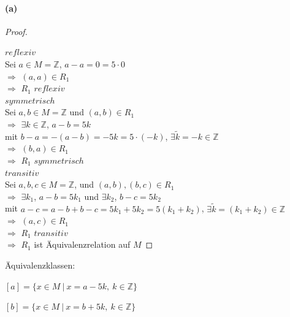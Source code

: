\paragraph{(a)}
\begin{proof}
$ $\newline

$reflexiv$\\
Sei $a\in M=\mathbb{Z}$, $a-a=0=5\cdot 0$\\
$\Rightarrow$ $(a,a)\in R_1$\\
$\Rightarrow$ $R_1$ $reflexiv$\\

$symmetrisch$\\
Sei $a,b\in M=\mathbb{Z}$ und $(a,b)\in R_1$\\
$\Rightarrow$ $\exists k\in\mathbb{Z}$, $a-b=5k$\\
mit $b-a=-(a-b)=-5k=5\cdot(-k)$, $\exists\tilde{k}=-k\in\mathbb{Z}$\\
$\Rightarrow$ $(b,a)\in R_1$\\
$\Rightarrow$ $R_1$ $symmetrisch$\\

$transitiv$\\
Sei $a,b,c\in M=\mathbb{Z}$, und $(a,b),(b,c)\in R_1$\\
$\Rightarrow$ $\exists k_1$, $a-b=5k_1$ und $\exists k_2$, $b-c=5k_2$\\
mit $a-c=a-b+b-c=5k_1+5k_2=5(k_1+k_2)$, $\exists\tilde{k}=(k_1+k_2)\in\mathbb{Z}$\\
$\Rightarrow$ $(a,c)\in R_1$\\
$\Rightarrow$ $R_1$ $transitiv$\\

$\Rightarrow$ $R_1$ ist Äquivalenzrelation auf $M$
\end{proof}

Äquivalenzklassen:

$[a]=\{x\in M\ |\ x=a-5k,\ k\in\mathbb{Z}\}$

$[b]=\{x\in M\ |\ x=b+5k,\ k\in\mathbb{Z}\}$

\newpage

